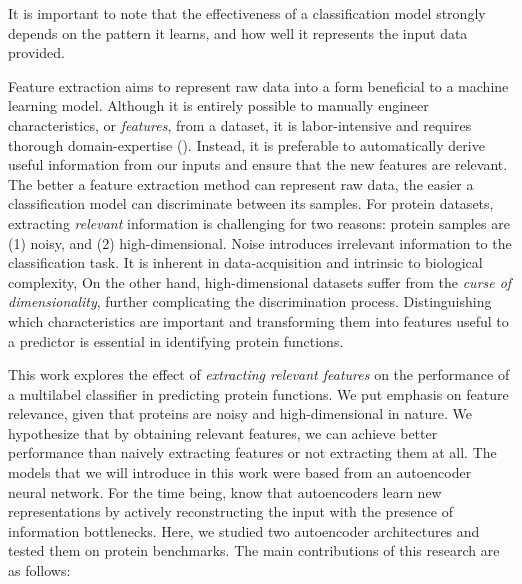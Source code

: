 \noindent It is important to note that the effectiveness of a classification
model strongly depends on the pattern it learns, and how well it represents
the input data provided.

\par Feature extraction aims to represent raw data into a form beneficial to
a machine learning model. Although it is entirely possible to manually
engineer characteristics, or \textit{features}, from a dataset, it is
labor-intensive and requires thorough domain-expertise
(\cite{bengio2013representation}). Instead, it is preferable to automatically
derive useful information from our inputs and ensure that the new features
are relevant. The better a feature extraction method can represent raw data,
the easier a classification model can discriminate between its samples. For
protein datasets, extracting \textit{relevant} information is challenging for
two reasons: protein samples are (1) noisy, and (2) high-dimensional. Noise
introduces irrelevant information to the classification task. It is inherent
in data-acquisition and intrinsic to biological complexity, On the other
hand, high-dimensional datasets suffer from the \textit{curse of
dimensionality}, further complicating the discrimination process.
Distinguishing which characteristics are important and transforming them into
features useful to a predictor is essential in identifying protein functions.

\newpage

\par This work explores the effect of \textit{extracting
relevant features} on the performance of a multilabel classifier in
predicting protein functions. We put emphasis on feature relevance, given that
proteins are noisy and high-dimensional in nature. We hypothesize that by
obtaining relevant features, we can achieve better performance than naively
extracting features or not extracting them at all. The models that we will
introduce in this work were based from an autoencoder neural network. For the
time being, know that autoencoders learn new representations by actively
reconstructing the input with the presence of information bottlenecks. Here, we
studied two autoencoder architectures and tested them on protein benchmarks.
The main contributions of this research are as follows:

